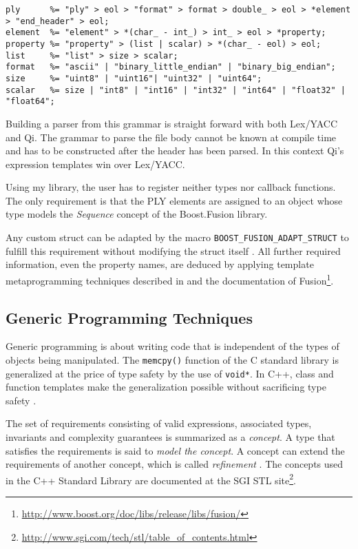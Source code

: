 \documentclass[a4paper,parskip=half,twocolumn]{scrartcl}
\begin{document}
\begin{lstlisting}[float=*,frame=tb,caption=C++ Grammar of the PLY file header]
ply      %= "ply" > eol > "format" > format > double_ > eol > *element > "end_header" > eol;
element  %= "element" > *(char_ - int_) > int_ > eol > *property;
property %= "property" > (list | scalar) > *(char_ - eol) > eol;
list     %= "list" > size > scalar;
format   %= "ascii" | "binary_little_endian" | "binary_big_endian";
size     %= "uint8" | "uint16"| "uint32" | "uint64";
scalar   %= size | "int8" | "int16" | "int32" | "int64" | "float32" | "float64";
\end{lstlisting}


Building a parser from this grammar is straight forward with both Lex/YACC and
Qi. The grammar to parse the file body cannot be known at compile time and has
to be constructed after the header has been parsed. In this context Qi's
expression templates win over Lex/YACC.

Using my library, the user has to register neither types nor callback functions.
The only requirement is that the PLY elements are assigned to an object whose
type models the \emph{Sequence} concept of the Boost.Fusion library.

Any custom struct can be adapted by the macro
\texttt{BOOST\_FUSION\_ADAPT\_STRUCT} to fulfill this requirement without
modifying the struct itself . All further required information, even the
property names, are deduced by applying template metaprogramming techniques
described in \cite{Abrahams:2004:CTM:1044941} and the documentation of
Fusion\footnote{\url{http://www.boost.org/doc/libs/release/libs/fusion/}}.

\subsection{Generic Programming Techniques}

Generic programming is about writing code that is independent of the types of
objects being manipulated. The \texttt{memcpy()} function of the C standard
library is generalized at the price of type safety by the use of \texttt{void*}.
In C++, class and function templates make the generalization possible without
sacrificing type safety
\cite{Alexandrescu:2001:MCD:377789,Meyers:2005:ECS:1051335}.

The set of requirements consisting of valid expressions, associated types,
invariants and complexity guarantees is summarized as a \emph{concept}. A type
that satisfies the requirements is said to \emph{model the concept}. A concept
can extend the requirements of another concept, which is called
\emph{refinement} \cite{gregor08:devx_concepts}. The concepts used in the C++
Standard Library are documented at the SGI STL
site\footnote{\url{http://www.sgi.com/tech/stl/table_of_contents.html}}.
\end{document}
